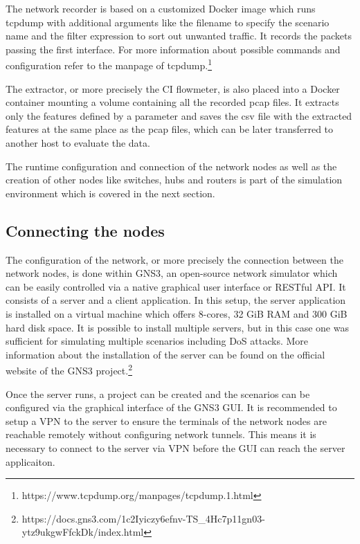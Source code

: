 \documentclass[conference]{IEEEtran}
\begin{document}
The network recorder is based on a customized Docker image which runs tcpdump with additional arguments like the filename to specify the scenario name and the filter expression to sort out unwanted traffic. It records the packets passing the first interface. For more information about possible commands and configuration refer to the manpage of tcpdump.\footnote{https://www.tcpdump.org/manpages/tcpdump.1.html}

The extractor, or more precisely the CI flowmeter, is also placed into a Docker container mounting a volume containing all the recorded pcap files. It extracts only the features defined by a parameter and saves the csv file with the extracted features at the same place as the pcap files, which can be later transferred to another host to evaluate the data.

The runtime configuration and connection of the network nodes as well as the creation of other nodes like switches, hubs and routers is part of the simulation environment which is covered in the next section.

\subsection{Connecting the nodes}

The configuration of the network, or more precisely the connection between the network nodes, is done within GNS3, an open-source network simulator which can be easily controlled via a native graphical user interface or RESTful API. It consists of a server and a client application. In this setup, the server application is installed on a virtual machine which offers 8-cores, 32 GiB RAM and 300 GiB hard disk space. It is possible to install multiple servers, but in this case one was sufficient for simulating multiple scenarios including DoS attacks. More information about the installation of the server can be found on the official website of the GNS3 project.\footnote{https://docs.gns3.com/1c2Iyiczy6efnv-TS\_4Hc7p11gn03-ytz9ukgwFfckDk/index.html} 

Once the server runs, a project can be created and the scenarios can be configured via the graphical interface of the GNS3 GUI. It is recommended to setup a VPN to the server to ensure the terminals of the network nodes are reachable remotely without configuring network tunnels. This means it is necessary to connect to the server via VPN before the GUI can reach the server applicaiton.
\end{document}
